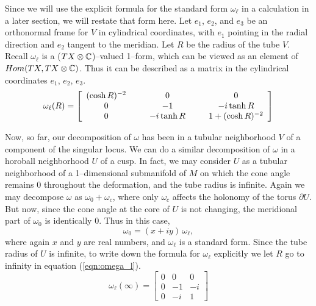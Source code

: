 Since we will use the explicit formula for the standard form
$\omega_\ell$ in a calculation in a later section, we will restate
that form here.  Let $e_1$, $e_2$, and $e_3$ be an orthonormal frame
for $V$ in cylindrical coordinates, with $e_1$ pointing in the radial
direction and $e_2$ tangent to the meridian.  Let $R$ be the radius of
the tube $V$.  Recall $\omega_\ell$ is a ($TX\otimes{\mathbb{C}}$)--valued
1--form, which can be viewed as an element of $Hom(TX, TX\otimes{\mathbb{C}})$.
Thus it can be described as a matrix in the cylindrical coordinates
$e_1$, $e_2$, $e_3$.
\begin{equation}
  \omega_\ell(R) = \left[
    \begin{array}{ccccc}
      (\cosh R)^{-2} & \hspace{.1in} & 0 &\hspace{.1in}& 0 \\
      0 && -1 && -i\tanh R \\
      0 && -i\tanh R && 1+ (\cosh R)^{-2}
    \end{array}
    \right]
  \label{eqn:omega_l}
\end{equation}


Now, so far, our decomposition of $\omega$ has been in a tubular
neighborhood $V$ of a component of the singular locus.  We can do a
similar decomposition of $\omega$ in a horoball neighborhood $U$ of a
cusp.  In fact, we may consider $U$ as a tubular neighborhood of a
1--dimensional submanifold of $M$ on which the cone angle remains $0$
throughout the deformation, and the tube radius is infinite.  Again we
may decompose $\omega$ as $\omega_0 + \omega_c$, where only $\omega_c$
affects the holonomy of the torus $\partial U$.  But now, since the
cone angle at the core of $U$ is not changing, the meridional part of
$\omega_0$ is identically $0$.  Thus in this case,
$$\omega_0 = (x + iy)\, \omega_\ell,$$
where again $x$ and $y$ are real numbers, and $\omega_\ell$ is a
standard form.  Since the tube radius of $U$ is infinite, to write
down the formula for $\omega_\ell$ explicitly we let $R$ go to
infinity in equation (\ref{eqn:omega_l}).
\begin{equation}
  \omega_\ell(\infty) = \left[
    \begin{array}{ccc}
      0 & 0 & 0\\
      0 & -1 & -i\\
      0 & -i & 1
    \end{array}\right]
  \label{eqn:omega_l-cusp}
\end{equation}

